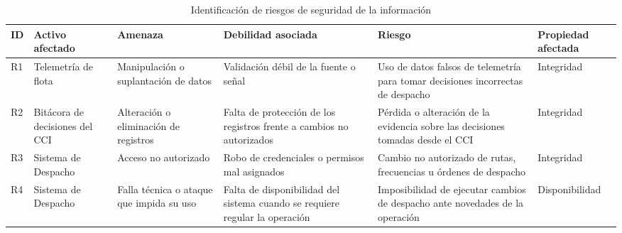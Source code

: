 \begin{landscape}
	
	\begin{table}[H]
		\centering
		\caption{Identificación de riesgos de seguridad de la información}
		\label{tab:identificacion-riesgos}
		\footnotesize
		\renewcommand{\arraystretch}{1.3}
		
		\begin{tabularx}{\linewidth}{
				>{\centering\arraybackslash}p{0.8cm}
				>{\raggedright\arraybackslash}p{3.4cm}
				>{\raggedright\arraybackslash}p{3.5cm}
				>{\raggedright\arraybackslash}p{4.2cm}
				>{\raggedright\arraybackslash}X
				>{\raggedright\arraybackslash}p{3cm}
			}
			\toprule
			\textbf{ID} &
			\textbf{Activo afectado} &
			\textbf{Amenaza} &
			\textbf{Debilidad asociada} &
			\textbf{Riesgo} &
			\textbf{Propiedad afectada} \\
			\midrule
			
			R1 &
			Telemetría de flota &
			Manipulación o suplantación de datos &
			Validación débil de la fuente o señal &
			Uso de datos falsos de telemetría para tomar decisiones incorrectas de despacho &
			Integridad \\
			
			\midrule
			
			R2 &
			Bitácora de decisiones del CCI &
			Alteración o eliminación de registros &
			Falta de protección de los registros frente a cambios no autorizados &
			Pérdida o alteración de la evidencia sobre las decisiones tomadas desde el CCI &
			Integridad \\
			
			\midrule
			
			R3 &
			Sistema de Despacho &
			Acceso no autorizado &
			Robo de credenciales o permisos mal asignados &
			Cambio no autorizado de rutas, frecuencias u órdenes de despacho &
			Integridad \\
			
			\midrule
			
			R4 &
			Sistema de Despacho &
			Falla técnica o ataque que impida su uso &
			Falta de disponibilidad del sistema cuando se requiere regular la operación &
			Imposibilidad de ejecutar cambios de despacho ante novedades de la operación &
			Disponibilidad \\
			
			\bottomrule
		\end{tabularx}
	\end{table}
	
\end{landscape}

